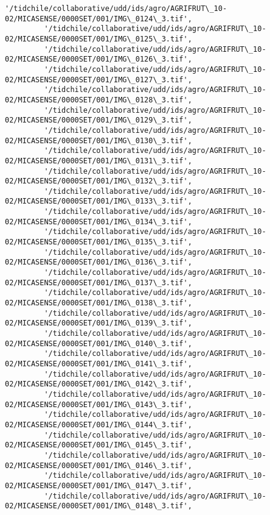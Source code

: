 \documentclass[11pt]{article}
\begin{document}
\begin{Verbatim}[commandchars=\\\{\}]
         '/tidchile/collaborative/udd/ids/agro/AGRIFRUT\_10-02/MICASENSE/0000SET/001/IMG\_0124\_3.tif',
         '/tidchile/collaborative/udd/ids/agro/AGRIFRUT\_10-02/MICASENSE/0000SET/001/IMG\_0125\_3.tif',
         '/tidchile/collaborative/udd/ids/agro/AGRIFRUT\_10-02/MICASENSE/0000SET/001/IMG\_0126\_3.tif',
         '/tidchile/collaborative/udd/ids/agro/AGRIFRUT\_10-02/MICASENSE/0000SET/001/IMG\_0127\_3.tif',
         '/tidchile/collaborative/udd/ids/agro/AGRIFRUT\_10-02/MICASENSE/0000SET/001/IMG\_0128\_3.tif',
         '/tidchile/collaborative/udd/ids/agro/AGRIFRUT\_10-02/MICASENSE/0000SET/001/IMG\_0129\_3.tif',
         '/tidchile/collaborative/udd/ids/agro/AGRIFRUT\_10-02/MICASENSE/0000SET/001/IMG\_0130\_3.tif',
         '/tidchile/collaborative/udd/ids/agro/AGRIFRUT\_10-02/MICASENSE/0000SET/001/IMG\_0131\_3.tif',
         '/tidchile/collaborative/udd/ids/agro/AGRIFRUT\_10-02/MICASENSE/0000SET/001/IMG\_0132\_3.tif',
         '/tidchile/collaborative/udd/ids/agro/AGRIFRUT\_10-02/MICASENSE/0000SET/001/IMG\_0133\_3.tif',
         '/tidchile/collaborative/udd/ids/agro/AGRIFRUT\_10-02/MICASENSE/0000SET/001/IMG\_0134\_3.tif',
         '/tidchile/collaborative/udd/ids/agro/AGRIFRUT\_10-02/MICASENSE/0000SET/001/IMG\_0135\_3.tif',
         '/tidchile/collaborative/udd/ids/agro/AGRIFRUT\_10-02/MICASENSE/0000SET/001/IMG\_0136\_3.tif',
         '/tidchile/collaborative/udd/ids/agro/AGRIFRUT\_10-02/MICASENSE/0000SET/001/IMG\_0137\_3.tif',
         '/tidchile/collaborative/udd/ids/agro/AGRIFRUT\_10-02/MICASENSE/0000SET/001/IMG\_0138\_3.tif',
         '/tidchile/collaborative/udd/ids/agro/AGRIFRUT\_10-02/MICASENSE/0000SET/001/IMG\_0139\_3.tif',
         '/tidchile/collaborative/udd/ids/agro/AGRIFRUT\_10-02/MICASENSE/0000SET/001/IMG\_0140\_3.tif',
         '/tidchile/collaborative/udd/ids/agro/AGRIFRUT\_10-02/MICASENSE/0000SET/001/IMG\_0141\_3.tif',
         '/tidchile/collaborative/udd/ids/agro/AGRIFRUT\_10-02/MICASENSE/0000SET/001/IMG\_0142\_3.tif',
         '/tidchile/collaborative/udd/ids/agro/AGRIFRUT\_10-02/MICASENSE/0000SET/001/IMG\_0143\_3.tif',
         '/tidchile/collaborative/udd/ids/agro/AGRIFRUT\_10-02/MICASENSE/0000SET/001/IMG\_0144\_3.tif',
         '/tidchile/collaborative/udd/ids/agro/AGRIFRUT\_10-02/MICASENSE/0000SET/001/IMG\_0145\_3.tif',
         '/tidchile/collaborative/udd/ids/agro/AGRIFRUT\_10-02/MICASENSE/0000SET/001/IMG\_0146\_3.tif',
         '/tidchile/collaborative/udd/ids/agro/AGRIFRUT\_10-02/MICASENSE/0000SET/001/IMG\_0147\_3.tif',
         '/tidchile/collaborative/udd/ids/agro/AGRIFRUT\_10-02/MICASENSE/0000SET/001/IMG\_0148\_3.tif',

\end{Verbatim}
\end{document}
